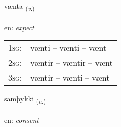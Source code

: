 \documentclass[frontgrid, backgrid]{flacards}\usepackage[]{graphicx}\usepackage[]{color}
\begin{document}
\renewcommand{\flhead}{\vskip5pt \fboxsep=0pt {\small\bfseries\footnotesize Sagnorð | Verb}}
\renewcommand{\fcfoot}{\vskip5pt \fboxsep=0pt \hspace{2pt}{\small\bfseries\footnotesize 2K}}

\renewcommand{\blhead}{\vskip5pt {\small\bfseries\footnotesize Sagnorð | Verb }}
\renewcommand{\bcfoot}{\vskip5pt \hspace{2pt}{\small\bfseries\footnotesize 2K}}


{vænta \small{\textsubscript{(\textit{v.})}} \\[1ex] %
\textphonetic{[vain̥ta]} \\
en: \emph{expect} \\  [2ex]
\renewcommand*{\arraystretch}{0.8}
\begin{tabular}{p{1cm}l}
\textsc{1sg}: & vænti -- vænti -- vænt \\ 
\textsc{2sg}: & væntir -- væntir -- vænt \\ 
\textsc{3sg}: & væntir -- vænti -- vænt \\ 
\end{tabular}
}

\renewcommand{\flhead}{\vskip5pt \fboxsep=0pt {\small\bfseries\footnotesize Nafnorð | Noun}}
\renewcommand{\fcfoot}{\vskip5pt \fboxsep=0pt \hspace{2pt}{\small\bfseries\footnotesize 2K}}

\renewcommand{\blhead}{\vskip5pt {\small\bfseries\footnotesize Nafnorð | Noun }}
\renewcommand{\bcfoot}{\vskip5pt \hspace{2pt}{\small\bfseries\footnotesize 2K}}


{samþykki \small{\textsubscript{(\textit{n.})}} \\[1ex] %
\textphonetic{[samθɪhcɪ]} \\
en: \emph{consent} \\  [2ex]
\renewcommand*{\arraystretch}{0.8}
}
\end{document}
